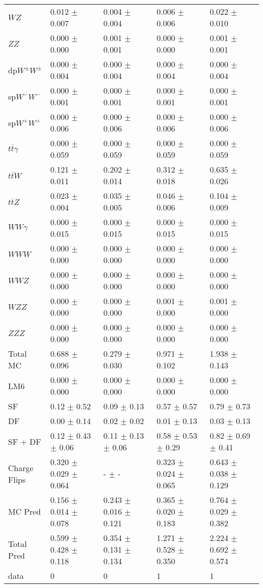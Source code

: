 \begin{tabular}{l | l l l l}
$WZ$ &  0.012 $\pm$  0.007 &  0.004 $\pm$  0.004 &  0.006 $\pm$  0.006 &  0.022 $\pm$  0.010\\
$ZZ$ &  0.000 $\pm$   0.000 &  0.001 $\pm$  0.001 &   0.000 $\pm$   0.000 &  0.001 $\pm$  0.001\\
\hline
dp$W^{\pm}W^{\pm}$ &  0.000 $\pm$  0.004 &  0.000 $\pm$  0.004 &  0.000 $\pm$  0.004 &  0.000 $\pm$  0.004\\
sp$W^{-}W^{-}$ &  0.000 $\pm$  0.001 &  0.000 $\pm$  0.001 &  0.000 $\pm$  0.001 &  0.000 $\pm$  0.001\\
sp$W^{+}W^{+}$ &  0.000 $\pm$  0.006 &  0.000 $\pm$  0.006 &  0.000 $\pm$  0.006 &  0.000 $\pm$  0.006\\
$t\overline{t}\gamma$ &  0.000 $\pm$  0.059 &  0.000 $\pm$  0.059 &  0.000 $\pm$  0.059 &  0.000 $\pm$  0.059\\
$t\overline{t}W$ &  0.121 $\pm$  0.011 &  0.202 $\pm$  0.014 &  0.312 $\pm$  0.018 &  0.635 $\pm$  0.026\\
$t\overline{t}Z$ &  0.023 $\pm$  0.004 &  0.035 $\pm$  0.005 &  0.046 $\pm$  0.006 &  0.104 $\pm$  0.009\\
$WW\gamma$ &  0.000 $\pm$  0.015 &  0.000 $\pm$  0.015 &  0.000 $\pm$  0.015 &  0.000 $\pm$  0.015\\
$WWW$ &   0.000 $\pm$   0.000 &   0.000 $\pm$   0.000 &   0.000 $\pm$   0.000 &   0.000 $\pm$   0.000\\
$WWZ$ &   0.000 $\pm$   0.000 &   0.000 $\pm$   0.000 &  0.000 $\pm$   0.000 &   0.000 $\pm$   0.000\\
$WZZ$ &  0.000 $\pm$   0.000 &   0.000 $\pm$   0.000 &  0.001 $\pm$   0.000 &  0.001 $\pm$   0.000\\
$ZZZ$ &   0.000 $\pm$   0.000 &   0.000 $\pm$   0.000 &   0.000 $\pm$   0.000 &   0.000 $\pm$   0.000\\
\hline
Total MC &  0.688 $\pm$  0.096 &  0.279 $\pm$  0.030 &  0.971 $\pm$  0.102 &  1.938 $\pm$  0.143\\
\hline\hline
\hline
LM6 &  0.000 $\pm$  0.000 &  0.000 $\pm$  0.000 &  0.000 $\pm$  0.000 &  0.000 $\pm$  0.000\\
\hline\hline
\hline\hline
 SF  & 0.12 $\pm$ 0.52 & 0.09 $\pm$ 0.13 & 0.57 $\pm$ 0.57 & 0.79 $\pm$ 0.73\\
 DF  & 0.00 $\pm$ 0.14 & 0.02 $\pm$ 0.02 & 0.01 $\pm$ 0.13 & 0.03 $\pm$ 0.13\\
\hline
 SF + DF  & 0.12 $\pm$ 0.43 $\pm$ 0.06 & 0.11 $\pm$ 0.13 $\pm$ 0.06 & 0.58 $\pm$ 0.53 $\pm$ 0.29 & 0.82 $\pm$ 0.69 $\pm$ 0.41\\
\hline\hline
Charge Flips & 0.320 $\pm$ 0.029 $\pm$ 0.064 & - $\pm$ - & 0.323 $\pm$ 0.024 $\pm$ 0.065 & 0.643 $\pm$ 0.038 $\pm$ 0.129\\
\hline\hline
\hline
MC Pred &  0.156 $\pm$  0.014 $\pm$  0.078 &  0.243 $\pm$  0.016 $\pm$  0.121 &  0.365 $\pm$  0.020 $\pm$  0.183 &  0.764 $\pm$  0.029 $\pm$  0.382\\
\hline\hline
Total Pred &  0.599 $\pm$  0.428 $\pm$  0.118 &  0.354 $\pm$  0.131 $\pm$  0.134 &  1.271 $\pm$  0.528 $\pm$  0.350 &  2.224 $\pm$  0.692 $\pm$  0.574\\
\hline\hline
data & 0 & 0 & 1 & 1\\
\hline\hline
\end{tabular}
